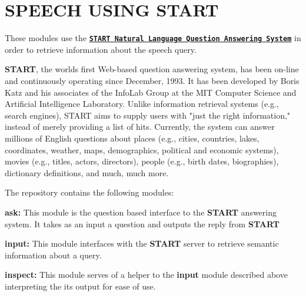 \chapter{SPEECH USING START}
\label{md__2home_2runner_2work_2speech_2speech_2gh-pages_2speech-interpreters_2start_2README}
These modules use the \href{http://start.csail.mit.edu/index.php}{\texttt{ {\bfseries{START Natural Language Question Answering System}}}} in order to retrieve information about the speech query.

{\bfseries{START}}, the world\textquotesingle{}s first {\ttfamily Web-\/based question answering system}, has been on-\/line and continuously operating since December, 1993. It has been developed by {\ttfamily Boris Katz} and his associates of the Info\+Lab Group at the {\ttfamily MIT Computer Science and Artificial Intelligence Laboratory}. Unlike information retrieval systems (e.\+g., search engines), START aims to supply users with "{}just the right information,"{} instead of merely providing a list of hits. Currently, the system can answer millions of English questions about places (e.\+g., cities, countries, lakes, coordinates, weather, maps, demographics, political and economic systems), movies (e.\+g., titles, actors, directors), people (e.\+g., birth dates, biographies), dictionary definitions, and much, much more.

The repository contains the following modules\+:


\begin{DoxyEnumerate}
\item {\bfseries{ask\+:}} This module is the question based interface to the {\bfseries{START}} answering system. It takes as an input a question and outputs the reply from {\bfseries{START}}
\item {\bfseries{input\+:}} This module interfaces with the {\bfseries{START}} server to retrieve semantic information about a query.
\item {\bfseries{inspect\+:}} This module serves of a helper to the {\bfseries{input}} module described above interpreting the its output for ease of use. 
\end{DoxyEnumerate}